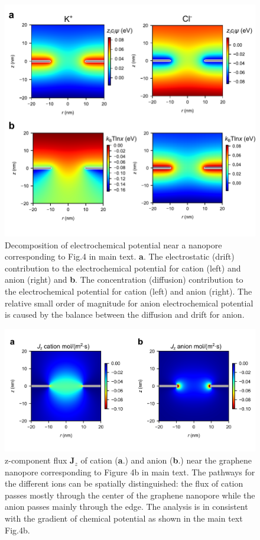 \documentclass[manuscript=suppinfo,email=true, hyperref=true, keywords=false]{achemso}
\newcommand{\Fig}{Fig.}
\begin{document}
\begin{figure}[htbp]
  \centering
  \includegraphics[width=0.8\linewidth]{img/SI-electrochemical-decomposite.pdf}
  \caption{Decomposition of electrochemical potential near a nanopore
    corresponding to \Fig 4 in main text. \textbf{a}. The electrostatic
    (drift) contribution to the electrochemical potential for cation
    (left) and anion (right) and \textbf{b}. The concentration (diffusion)
    contribution to the electrochemical potential for cation (left)
    and anion (right). The relative small order of magnitude for anion
    electrochemical potential is caused by the balance between the
    diffusion and drift for anion.}
  \label{fig:potential}
\end{figure}

\begin{figure}[htbp]
  \centering
  \includegraphics[width=0.8\linewidth]{img/SI-flux.png}
  \caption{z-component flux $\boldsymbol{J}_{z}$ of cation
    (\textbf{a}.)  and anion (\textbf{b}.) near the graphene nanopore
    corresponding to Figure 4b in main text. The pathways for the
    different ions can be spatially distinguished: the flux of cation
    passes mostly through the center of the graphene nanopore while
    the anion passes mainly through the edge. The analysis is in
    consistent with the gradient of chemical potential as shown in the
    main text \Fig 4b.}
  \label{fig:flux}
\end{figure}
\end{document}
